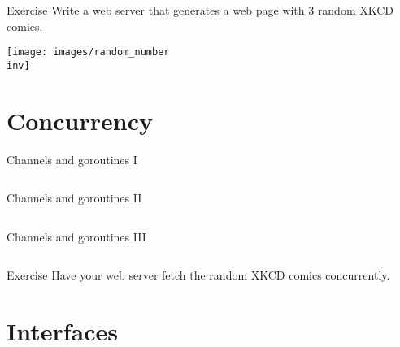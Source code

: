 \documentclass[10pt]{beamer}
\newcommand{\inv}{-inv}
\begin{document}
	
	\begin{frame}[fragile]{Exercise}
		Write a web server that generates a web page with 3 random XKCD comics.\\
		\begin{center}
			\texttt{[image: images/random\_number\\inv]}
		\end{center}
	\end{frame}

	
	\section{Concurrency}
							
	
	\begin{frame}[t,fragile]{Channels and goroutines I}
		\inputminted{go}{code/14_stack.go}
	\end{frame}
								
	
	\begin{frame}[t,fragile]{Channels and goroutines II}
		\inputminted[firstnumber=last,fontsize=\footnotesize]{go}{code/14b_stack.go}
	\end{frame}
									
	
	\begin{frame}[t,fragile]{Channels and goroutines III}
		\inputminted[firstnumber=last,fontsize=\footnotesize]{go}{code/14c_stack.go}
	\end{frame}
	
	
	\begin{frame}[fragile]{Exercise}
		Have your web server fetch the random XKCD comics concurrently.
	\end{frame}

	
	\section{Interfaces}
							
\end{document}
